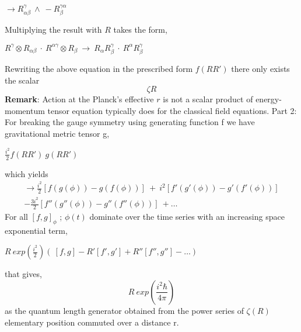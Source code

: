 \documentclass{article}
\begin{document}
 \begin{center}
 \begin{math}
       \rightarrow R_{\alpha \beta}^\gamma  \ \wedge \ -R_{\beta}^{\gamma \alpha} 
 \end{math}
 \end{center} Multiplying the result with $R$ takes the form,
 \begin{center}
 \begin{math}
       R^\gamma \otimes R_{\alpha \beta} \ \cdot \ R^{\alpha \gamma} \otimes  R_{\beta} \ \rightarrow \ R_{\alpha} R_{\beta}^\gamma \ \cdot \ R^{\alpha} R_{\beta}^\gamma 
 \end{math}
 \end{center} Rewriting the above equation in the prescribed form $f(RR')$ there only exists the scalar \begin{equation}
      \zeta R 
 \end{equation}
 {\bf Remark}: Action at the Planck’s effective $r$ is not a scalar product of energy-momentum tensor equation typically does for the classical field equations. \vspace{5mm} \newline
 Part 2: For breaking the gauge symmetry using generating function f we have gravitational metric tensor g,
 \begin{center}
 \begin{math}
      \frac{i^2}{2} f(RR') \ g(RR')  
 \end{math}
 \end{center} which yields
 \begin{equation}
 \begin{split}
       \rightarrow  \frac{i^2}{2} [f(g(\phi)) -g(f(\phi))] \ + \ i^2 [f'(g'(\phi))-g'(f'(\phi))] \\ - \frac{3i^2}{2} [f''(g''(\phi))-g''(f''(\phi))] \ + \dots 
 \end{split}
 \end{equation} For all $[f,g]_\phi$ ; $\phi(t)$ dominate over the time series with an increasing space exponential term,
 \begin{center}
 \begin{math}
            R\ exp({\frac{i^2}{2}}) ( \ [f, g] - R'[f', g'] + R'' [f'', g'']- \dots ) 
 \end{math}
 \end{center} that gives, 
 \begin{equation}
    R\ exp(\frac{i^2 \hbar}{4 \pi}) 
 \end{equation} 
 as the quantum length generator obtained from the power series of $\zeta (R)$ elementary position commuted over a distance r.\vspace{5mm} \newline
\end{document}
